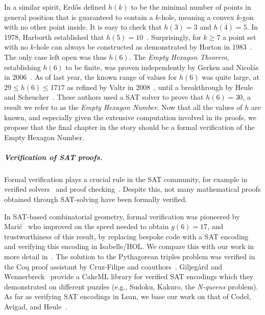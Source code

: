 In a similar spirit,
Erd\H{o}s defined $h(k)$
to be the minimal number of points in general position
that is guaranteed to contain a $k$-hole,
meaning a convex $k$-gon with no other point inside.
It is easy to check that $h(3) = 3$ and $h(4) = 5$.
In 1978, Harborth established that $h(5) = 10$~\cite{Harborth1978}.
Surprisingly, for $k \geq 7$ a point set with no $k$-hole
can always be constructed
as demonstrated by Horton in 1983~\cite{hortonSetsNoEmpty1983}.
The only case left open was thus $h(6)$.
The \emph{Empty Hexagon Theorem},
establishing $h(6)$ to be finite,
was proven independently by Gerken and Nicolás in 2006~\cite{gerkenEmptyConvexHexagons2008,nicolasEmptyHexagonTheorem2007}.
As of last year,
the known range of values for $h(6)$ was quite large,
at $29 \leq h(6) \leq 1717$
as refined by Valtr in 2008~\cite{valtr},
until a breakthrough by Heule and Scheucher~\cite{emptyHexagonNumber}.
These authors used a SAT solver
to prove that $h(6) = 30$,
a result we refer to as the \emph{Empty Hexagon Number}.
Now that all the values of $h$ are known,
and especially given the extensive computation involved in its proofs,
we propose that the final chapter in the story
should be a formal verification of the Empty Hexagon Number.

\subparagraph*{Verification of SAT proofs.}
Formal verification plays a crucial rule in the SAT community,
for example in verified solvers~\cite{10maric_formal_verification_modern_sat_solver_shallow_embedding_isabelle_hol,oeVersatVerifiedModern2012,skotam_creusat_2022}
and proof checking~\cite{lammichEfficientVerifiedSAT2020,tanVerifiedPropagationRedundancy2023}.
Despite this,
not many mathematical proofs obtained through SAT-solving
have been formally verified.

In SAT-based combinatorial geometry,
formal verification was pioneered by Marić~\cite{19maric_fast_formal_proof_erdos_szekeres_conjecture_convex_polygons_most_six_points}
who improved on the speed needed to obtain $g(6) = 17$,
and trustworthiness of this result,
by replacing bespoke code with a SAT encoding
and verifying this encoding in \textsf{Isabelle/HOL}.
We compare this with our work in more detail in~.
The solution to the Pythagorean triples problem
was verified in the \textsf{Coq} proof assistant
by Cruz-Filipe and coauthors~\cite{formalPythagoreanTriples,LPAR-21:Formally_Proving_Boolean_Pythagorean}.
Giljeg\r{a}rd and Wennerbreck~\cite{GilAndWennerbeck} provide a \textsf{CakeML} library
for verified SAT encodings
which they demonstrated on different puzzles
(e.g., Sudoku, Kakuro, the \emph{N-queens} problem).
As far as verifying SAT encodings in Lean,
we base our work on that of Codel, Avigad, and Heule~\cite{Cayden}.

